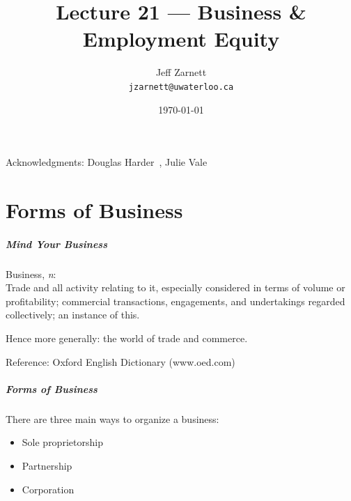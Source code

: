 

\title{Lecture 21 --- Business \& Employment Equity }

\author{Jeff Zarnett \\ \small \texttt{jzarnett@uwaterloo.ca}}
\date{\today}




\begin{frame}
  \titlepage

\begin{center}
  \small{Acknowledgments: Douglas Harder~\cite{dwh}, Julie Vale~\cite{jv}}
  \end{center}
\end{frame}

\part{Forms of Business}

\begin{frame}
\partpage
\end{frame}



\begin{frame}
\frametitle{Mind Your Business}

Business, \textit{n}:\\
\quad Trade and all activity relating to it, especially considered in terms of volume or profitability; commercial transactions, engagements, and undertakings regarded collectively; an instance of this.

Hence more generally: the world of trade and commerce.

Reference:  Oxford English Dictionary (www.oed.com)

\end{frame}



\begin{frame}
\frametitle{Forms of Business}

There are three main ways to organize a business:

\begin{itemize}
	\item Sole proprietorship
	\item Partnership
	\item Corporation
\end{itemize}

\end{frame}



